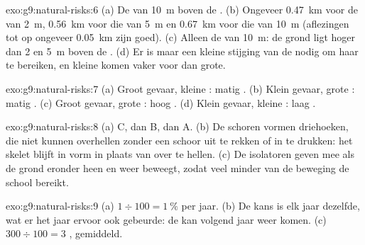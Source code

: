 \begin{solution}{exo:g9:natural-risks:6}
(a) De  van \qty{10}{m} boven de . (b) Ongeveer
\qty{0.47}{km} voor de  van \qty{2}{m}, \qty{0.56}{km} voor
die van \qty{5}{m} en \qty{0.67}{km} voor die van \qty{10}{m} (aflezingen
tot op ongeveer \qty{0.05}{km} zijn goed). (c) Alleen de  van
\qty{10}{m}: de grond ligt hoger dan 2 en \qty{5}{m} boven de .
(d) Er is maar een kleine stijging van de  nodig om haar te
bereiken, en kleine  komen vaker voor dan grote.
\end{solution}

\begin{solution}{exo:g9:natural-risks:7}
(a) Groot gevaar, kleine : matig . (b) Klein gevaar,
grote : matig . (c) Groot gevaar, grote :
hoog . (d) Klein gevaar, kleine : laag .
\end{solution}

\begin{solution}{exo:g9:natural-risks:8}
(a) C, dan B, dan A. (b) De schoren vormen driehoeken, die niet kunnen
overhellen zonder een schoor uit te rekken of in te drukken: het skelet
blijft in vorm in plaats van over te hellen. (c) De isolatoren geven mee
als de grond eronder heen en weer beweegt, zodat veel minder van de
beweging de school bereikt.
\end{solution}

\begin{solution}{exo:g9:natural-risks:9}
(a) $1 \div 100 = 1~\%$ per jaar. (b) De kans is elk jaar dezelfde, wat er
het jaar ervoor ook gebeurde: de  kan volgend jaar weer komen.
(c) $300 \div 100 = 3$ , gemiddeld.
\end{solution}

